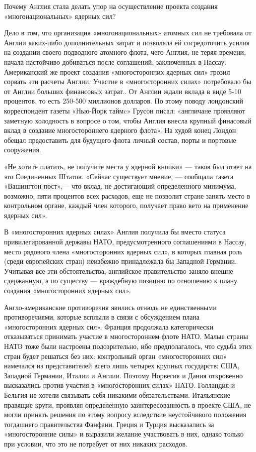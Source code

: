 \documentclass[12pt, a4paper, openany]{book}
\begin{document}
Почему Англия стала делать упор на осуществление проекта создания «многонациональных» ядерных сил?

Дело в том, что организация «многонациональных» атомных сил не требовала от Англии каких-либо дополнительных затрат и позволяла ей сосредоточить усилия на создании своего подводного атомного флота, чего Англия, не теряя времени, начала настойчиво добиваться после соглашений, заключенных в Нассау. Американский же проект создания «многосторонних ядерных сил» грозил сорвать эти расчеты Англии. Участие в «многосторонних силах» потребовало бы от Англии больших финансовых затрат.. От Англии ждали вклада в виде 5-10 процентов, то есть 250-500 миллионов долларов. По этому поводу лондонский корреспондент газеты «Нью-Йорк таймc» Грусон писал: «англичане проявляют заметную холодность в вопросе о том, чтобы Англия внесла крупный финасовый вклад в создание многостороннего ядерного флота». На худой конец Лондон обещал предоставить для будущего флота личный состав, порты и портовые сооружения.

«Не хотите платить, не получите места у ядерной кнопки» — таков был ответ на это Соединенных Штатов. «Сейчас существует мнение, — сообщала газета «Вашингтон пост»,— что вклад, не достигающий определенного минимума, возможно, пяти процентов всех расходов, еще не позволит стране занять место в контрольном органе, каждый член которого, получает право вето на применение ядерных сил».

В «многосторонних ядерных силах» Англия получила бы вместо статуса привилегированной державы НАТО, предусмотренного соглашениями в Нассау, место рядового члена «многосторонних ядерных сил», в которых главная роль (среди европейских стран) неизбежно принадлежала бы Западной Германии. Учитывая все эти обстоятельства, английское правительство заняло внешне сдержанную, а по существу — враждебную позицию по отношению к плану создания «многосторонних ядерных сил».

Англо-американские противоречия явились отнюдь не единственными противоречиями, которые всплыли в связи с обсуждением плана «многосторонних ядерных сил». Франция продолжала категорически отказываться принимать участие в многостороннем флоте НАТО. Малые страны НАТО тоже были настроены подозрительно, ибо предполагалось, что судьба этих стран будет решаться без них: контрольный орган «многосторонних сил» намечался из представителей всего лишь четырех крупных государств: США, Западной Германии, Италии и Англии. Поэтому Норвегия и Дания откровенно высказались против участия в «многосторонних силах» НАТО. Голландия и Бельгия не хотели связывать себя никакими обязательствами. Итальянские правящие круги, проявляя определенную заинтересованность в проекте США, не могли принять решения по этому вопросу вследствие неустойчивого положения тогдашнего правительства Фанфани. Греция и Турция высказались за «многосторонние силы» и выразили желание участвовать в них, однако только при условии, что это не потребует от них никаких расходов.
\end{document}

